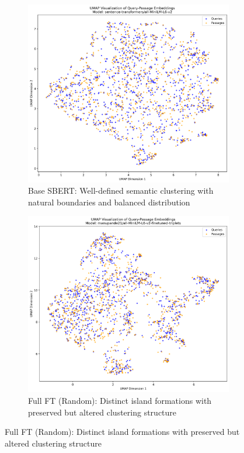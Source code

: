 \begin{figure}[p]
\centering

\begin{subfigure}{0.48\textwidth}
\centering
\includegraphics[width=\textwidth, height=0.75\textwidth, keepaspectratio]{umap_visualization_sentence_transformers_all_MiniLM_L6_v2.png}
\caption{Base SBERT: Well-defined semantic clustering with natural boundaries and balanced distribution}
\label{fig:umap_base_thesis}
\end{subfigure}
\hfill
\begin{subfigure}{0.48\textwidth}
\centering
\includegraphics[width=\textwidth, height=0.75\textwidth, keepaspectratio]{umap_visualization_manupande21_all_MiniLM_L6_v2_finetuned_triplets.png}
\caption{Full FT (Random): Distinct island formations with preserved but altered clustering structure}
\label{fig:umap_full_random_thesis}
\end{subfigure}


\end{figure}
